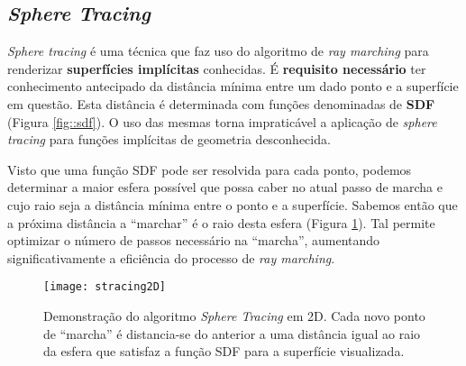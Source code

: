

\subsection{\textit{Sphere Tracing}}
\label{ssec::arte:raymarch:spheretracing}

\textit{Sphere tracing} é uma técnica que faz uso do algoritmo de \textit{ray marching} para renderizar \textbf{superfícies implícitas} conhecidas. É \textbf{requisito necessário} ter conhecimento antecipado da distância mínima entre um dado ponto e a superfície em questão. Esta distância é determinada com funções denominadas de \textbf{\ac{SDF}} (Figura \ref{fig::sdf}). O uso das mesmas torna impraticável a aplicação de \textit{sphere tracing} para funções implícitas de geometria desconhecida.

Visto que uma função \acs{SDF} pode ser resolvida para cada ponto, podemos determinar a maior esfera possível que possa caber no atual passo de marcha e cujo raio seja a distância mínima entre o ponto e a superfície. Sabemos então que a próxima distância a ``marchar'' é o raio desta esfera (Figura \ref{fig::stracing2D}). Tal permite optimizar o número de passos necessário na ``marcha'', aumentando significativamente a eficiência do processo de \textit{ray marching}.


\begin{figure}
	\texttt{[image: stracing2D]}
	\caption[Algoritmo de \textit{Sphere Tracing} em 2D]{Demonstração do algoritmo \textit{Sphere Tracing} em 2D. Cada novo ponto de ``marcha'' é distancia-se do anterior a uma distância igual ao raio da esfera que satisfaz a função \acs{SDF} para a superfície visualizada.}
	\label{fig::stracing2D}
\end{figure}

